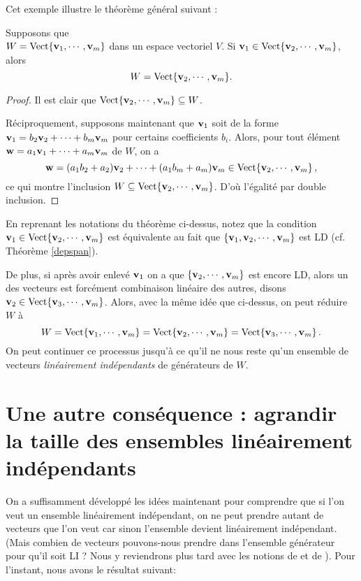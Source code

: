 Cet exemple illustre le théorème général suivant :
\pagebreak

\begin{theorem}
 Supposons que\\ $W= \textrm{Vect}\{ \mathbf{v}_1, \cdots, \mathbf{v}_m\}$ dans un espace vectoriel $V$.\hfill\break
Si $\mathbf{v}_1 \in \textrm{Vect}\{\mathbf{v}_2, \cdots, \mathbf{v}_m\}$, alors
$$
W = \textrm{Vect}\{ \mathbf{v}_2, \cdots, \mathbf{v}_m\}.
$$
\end{theorem}
\begin{proof} Il est clair que $\textrm{Vect}\{ \mathbf{v}_2, \cdots, \mathbf{v}_m\} \subseteq W$. 

Réciproquement, supposons maintenant que  $ \mathbf{v}_1$ soit de la forme $\mathbf{v}_1=b_2 \mathbf{v}_2 +\cdots +b_m\mathbf{v}_m$ pour certains coefficients $b_i$. Alors, pour tout élément $\mathbf{w}=a_1\mathbf{v}_1 +\cdots +a_m\mathbf{v}_m$ de $W$, on a $$\mathbf{w} =(a_1b_2 +a_2)\mathbf{v}_2 +\cdots + (a_1b_m +a_m)\mathbf{v}_m \in \textrm{Vect}\{ \mathbf{v}_2, \cdots, \mathbf{v}_m\}\,, $$
ce qui montre l'inclusion $
W \subseteq \textrm{Vect}\{ \mathbf{v}_2, \cdots, \mathbf{v}_m\}
$. D'o\`u l'égalité par double inclusion.
\end{proof}

En reprenant les notations du théorème ci-dessus, notez que la condition $\mathbf{v}_1 \in \textrm{Vect}\{\mathbf{v}_2, \cdots, \mathbf{v}_m\}$ est équivalente au fait que $\{\mathbf{v}_1,\mathbf{v}_2, \cdots, \mathbf{v}_m\}$ est LD (cf. Théorème \ref{depspan}).
 

De plus, si après avoir enlevé $\mathbf{v}_1$ on a que $\{ \mathbf{v}_2, \cdots, \mathbf{v}_m\}$ est encore LD, alors un des  vecteurs est forcément combinaison lin\'eaire des autres, disons $\mathbf{v}_2 \in \textrm{Vect}\{\mathbf{v}_3, \cdots, \mathbf{v}_m\}$. 
Alors, avec la même idée que ci-dessus, on peut réduire $W$ à 
$$W=\textrm{Vect}\{\mathbf{v}_1, \cdots, \mathbf{v}_m\}=\textrm{Vect}\{\mathbf{v}_2, \cdots, \mathbf{v}_m\}=\textrm{Vect}\{\mathbf{v}_3, \cdots, \mathbf{v}_m\}\,.$$
On peut continuer ce processus jusqu'à ce qu'il ne nous reste qu'un ensemble de vecteurs \emph{lin\'eairement 
indépendants} de générateurs de $W$.

\section[\'Extension d'ensembles LI]{Une autre conséquence : agrandir la taille des ensembles linéairement indépendants}

On a suffisamment d\'eveloppé les idées maintenant pour comprendre que si l'on veut un ensemble linéairement indépendant, on ne peut prendre autant de vecteurs que l'on veut car sinon l'ensemble devient linéairement indépendant. (Mais combien de vecteurs
pouvons-nous prendre dans l'ensemble générateur pour qu'il soit LI ?   Nous y reviendrons plus tard avec les notions de  et de ).
Pour l'instant, nous avons le r\'esultat suivant:

